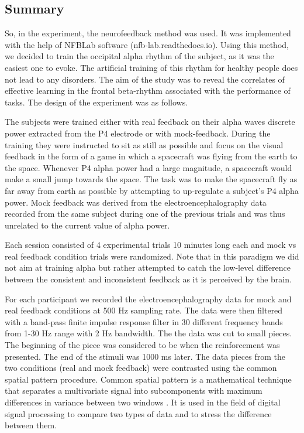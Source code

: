 \documentclass[14pt,a4paper]{scrartcl}
\begin{document}
\subsection{Summary}
\label{sec:Methods:Summary}

So, in the experiment, the neurofeedback method was used. It was implemented with the help of NFBLab software (nfb-lab.readthedocs.io). Using this method, we decided to train the occipital alpha rhythm of the subject, as it was the easiest one to evoke. The artificial training of this rhythm for healthy people does not lead to any disorders. The aim of the study was to reveal the correlates of effective learning in the frontal beta-rhythm associated with the performance of tasks. The design of the experiment was as follows.

The subjects were trained either with real feedback on their alpha waves discrete power extracted from the P4 electrode or with mock-feedback. During the training they were instructed to sit as still as possible and focus on the visual feedback in the form of a game in which a spacecraft was flying from the earth to the space. Whenever P4 alpha power had a large magnitude, a spacecraft would make a small jump towards the space. The task was to make the spacecraft fly as far away from earth as possible by attempting to up-regulate a subject’s P4 alpha power. Mock feedback was derived from the electroencephalography data recorded from the same subject during one of the previous trials and was thus unrelated to the current value of alpha power.

Each session consisted of 4 experimental trials 10 minutes long each and mock vs real feedback condition trials were randomized.  Note that in this paradigm we did not aim at training alpha but rather attempted to catch the low-level difference between the consistent and inconsistent feedback as it is perceived by the brain.

For each participant we recorded the electroencephalography data for mock and real feedback conditions at 500 Hz sampling rate. The data were then filtered with a band-pass finite impulse response filter in 30 different frequency bands from 1-30 Hz range with 2 Hz bandwidth. The the data was cut to small pieces. The beginning of the piece was considered to be when the reinforcement was presented. The end of the stimuli was 1000 ms later. The data pieces from the two conditions (real and mock feedback) were contrasted using the common spatial pattern procedure. Common spatial pattern is a mathematical technique that separates a multivariate signal into subcomponents with maximum differences in variance between two windows \cite{Koles1990}. It is used in the field of digital signal processing to compare two types of data and to stress the difference between them.
\end{document}
